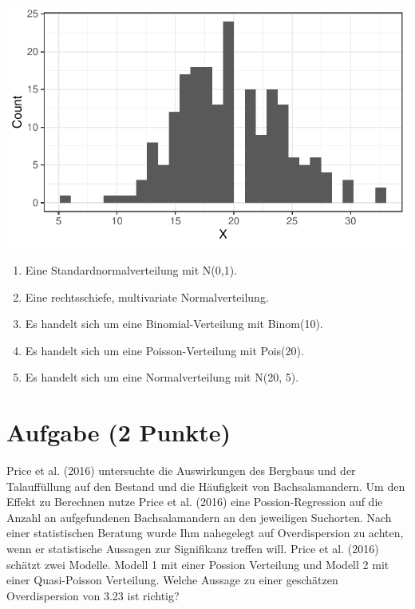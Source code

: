 \documentclass[a4paper, 10pt]{scrartcl}\usepackage[]{graphicx}\usepackage[]{color}
\makeatletter
\def\maxwidth{ %
  \ifdim\Gin@nat@width>\linewidth
    \linewidth
  \else
    \Gin@nat@width
  \fi
}
\makeatother
\begin{document}
{\centering \includegraphics[width=\maxwidth]{img/mc-distribution-02-a-1} 

}







\begin{enumerate}
\item [\textbf{A} \msquare] Eine Standardnormalverteilung mit N(0,1).
\item [\textbf{B} \msquare] Eine rechtsschiefe, multivariate Normalverteilung.
\item [\textbf{C} \msquare] Es handelt sich um eine Binomial-Verteilung mit Binom(10).
\item [\textbf{D} \msquare] Es handelt sich um eine Poisson-Verteilung mit Pois(20).
\item [\textbf{E} \msquare] Es handelt sich um eine Normalverteilung mit N(20, 5).
\end{enumerate}

\section{Aufgabe \hfill (2 Punkte)}




Price et al. (2016) untersuchte die Auswirkungen des Bergbaus und der
Talauff{\"u}llung auf den Bestand und die H{\"a}ufigkeit von Bachsalamandern. Um
den Effekt zu Berechnen nutze Price et al. (2016) eine Possion-Regression
auf die Anzahl an aufgefundenen Bachsalamandern an den jeweiligen
Suchorten. Nach einer statistischen Beratung wurde Ihm nahegelegt auf
Overdispersion zu achten, wenn er statistische Aussagen zur Signifikanz
treffen will. Price et al. (2016) sch{\"a}tzt zwei Modelle. Modell 1 mit einer
Possion Verteilung und Modell 2 mit einer Quasi-Poisson Verteilung. Welche
Aussage zu einer gesch{\"a}tzen Overdispersion von 3.23 ist
richtig?
\end{document}
